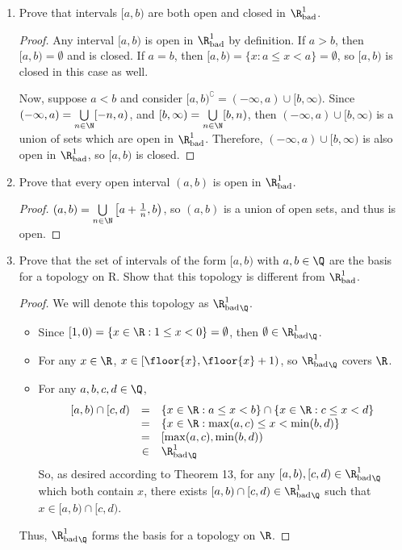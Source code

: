 \documentclass[letterpaper]{article}
\newcommand{\Rbad}{\R_\text{bad}}
\begin{document}
\begin{enumerate}
\begin{enumerate}
\begin{proof}
	$$a \in (m,n) \implies m<a<n \implies m<\tfrac{m+a}{2}<a<n.$$
	Thus, $\tfrac{m+a}{2}\in (m,n)$ but $\tfrac{m+a}{2}\not\in[a,b)$, so $(m,n)\not\subset[a,b)$. 
	\end{proof}
	\item Prove that intervals $[a,b)$ are both open and closed in $\Rbad^1$.
	\begin{proof}
	Any interval $[a,b)$ is open in $\Rbad^1$ by definition. If $a>b$, then $[a,b)=\emptyset$ and is closed. If $a=b$, then $[a,b)=\{x:a\leq x<a\}=\emptyset$, so $[a,b)$ is closed in this case as well.
	
	Now, suppose $a<b$ and consider $[a,b)^\complement = (-\infty,a)\cup[b,\infty)$. Since $(-\infty,a)=\bigcup\limits_{n\in\N}[-n,a)$, and $[b,\infty)=\bigcup\limits_{n\in\N}[b,n)$, then $(-\infty,a)\cup[b,\infty)$ is a union of sets which are open in $\Rbad^1$. Therefore, $(-\infty,a)\cup[b,\infty)$ is also open in $\Rbad^1$, so $[a,b)$ is closed.
	\end{proof}
	\item Prove that every open interval $(a,b)$ is open in $\Rbad^1$. 
	\begin{proof}
	$(a,b)=\bigcup\limits_{n\in\N}\left[a+\tfrac{1}{n},b\right)$, so $(a,b)$ is a union of open sets, and thus is open. 
	\end{proof}
	\item Prove that the set of intervals of the form $[a,b)$ with $a,b \in \Q$ are the basis for a topology on R. Show that this topology is different from $\Rbad^1$. 
	\begin{proof} We will denote this topology as ${\Rbad^1}_\Q$. 
		\begin{itemize}
		\item Since $[1,0)=\{x\in\R:1\leq x < 0\}=\emptyset$, then $\emptyset\in{\Rbad^1}_\Q$. 
		\item For any $x\in\R$, $x\in [\floor{x},\floor{x}+1)$, so ${\Rbad^1}_\Q$ covers $\R$. 
		\item For any $a,b,c,d\in\Q$, 
		\[
		\begin{array}{rcl}
		[a,b)\cap[c,d)&=&\{x\in\R:a\leq x < b\}\cap \{x\in\R:c\leq x < d\}\\
		&=&\{x\in\R: \max(a,c)\leq x < \min(b,d)\}\\
		&=&[\max(a,c),\min(b,d))\\
		&\in& {\Rbad^1}_\Q\\
		\end{array}
		\]
		So, as desired according to Theorem 13, for any $[a,b), [c,d) \in {\Rbad^1}_\Q$ which both contain $x$, there exists $[a,b)\cap[c,d) \in {\Rbad^1}_\Q$ such that $x\in [a,b)\cap[c,d)$. 
		\end{itemize}
	Thus, ${\Rbad^1}_\Q$ forms the basis for a topology on $\R$.\qedwhite
	

\end{proof}
\end{enumerate}
\end{enumerate}
\end{document}
